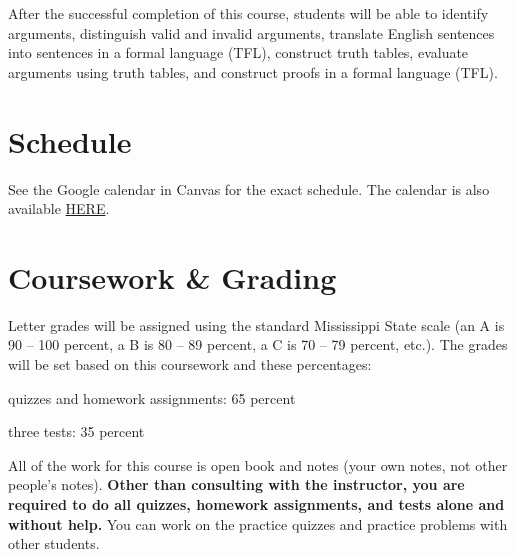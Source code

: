 \documentclass[11pt,oneside]{article}
\begin{document}
After the successful completion of this course, students will be able to identify arguments, distinguish valid and invalid arguments, translate English sentences into sentences in a formal language (TFL), construct truth tables, evaluate arguments using truth tables, and construct proofs in a formal language (TFL).



\section{Schedule}


See the Google calendar in Canvas for the exact schedule. The calendar is also available \href{https://calendar.google.com/calendar?cid=NnA2amwzOGtwMmY1OWc5N3RlNmtoZDNmZTBAZ3JvdXAuY2FsZW5kYXIuZ29vZ2xlLmNvbQ}{\url{HERE}}.
\vspace{3mm}

%

\vspace{3mm}



\section{Coursework \& Grading}

Letter grades will be assigned using the standard Mississippi State scale (an A is 90 – 100 percent, a B is 80 – 89 percent, a C is 70 – 79 percent, etc.). The grades will be set based on this coursework and these percentages:
\begin{description}
\item quizzes and homework assignments: 65 percent
\item three tests: 35 percent
\end{description}

\noindent All of the work for this course is open book and notes (your own notes, not other people’s notes). \textbf{Other than consulting with the instructor, you are required to do all quizzes, homework assignments, and tests alone and without help.} You can work on the practice quizzes and practice problems with other students. 
\end{document}
